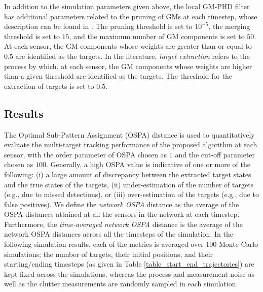 In addition to the simulation parameters given above, the local GM-PHD filter has additional parameters related to the pruning of GMs at each timestep, whose description can be found in \cite[Table II]{vo2006gmphd}. The pruning threshold is set to $10^{-5}$, the merging threshold is set to $15$, and the maximum number of GM components is set to $50$. At each sensor, the GM components whose weights are greater than or equal to $0.5$ are identified as the targets. In the literature, \textit{target extraction} refers to the process by which, at each sensor, the GM components whose weights are higher than a given threshold are identified as the targets. The threshold for the extraction of targets is set to $0.5$.

\subsection{Results}
The Optimal Sub-Pattern Assignment (OSPA) distance \cite{schuhmacher2008consistent} is used to quantitatively evaluate the multi-target tracking performance of the proposed algorithm at each sensor, with the order parameter of OSPA chosen as $1$ and the cut-off parameter chosen as $100$. Generally, a high OSPA value is indicative of one or more of the following: (i) a large amount of discrepancy between the extracted target states and the true states of the targets, (ii) under-estimation of the number of targets (e.g., due to missed detections), or (iii) over-estimation of the targets (e.g., due to false positives).
We define the \textit{network OSPA} distance as the average of the OSPA distances attained at all the sensors in the network at each timestep. Furthermore, the \textit{time-averaged network OSPA} distance is the average of the network OSPA distances across all the timesteps of the simulation.
In the following simulation results, each of the metrics is averaged over 100 Monte Carlo simulations; the number of targets, their initial positions, and their starting/ending timesteps (as given in Table \ref{table_start_end_trajectories}) are kept fixed across the simulations, whereas the process and measurement noise as well as the clutter measurements are randomly sampled in each simulation.


